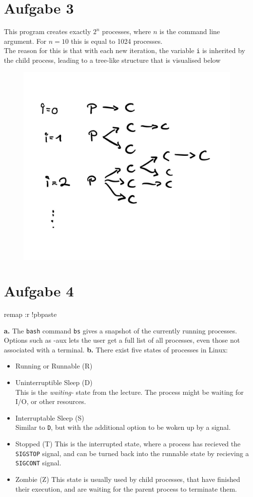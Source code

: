 \documentclass{article}
\begin{document}
\newpage

\section*{Aufgabe 3}
This program creates exactly \( 2 ^{n} \) processes, where \( n \) is the
command line argument. For \( n = 10 \) this is equal to 1024 processes.\\
The reason for this is that with each new iteration, the variable
\texttt{i} is inherited by the child process, leading to a tree-like
structure that is visualised below
\begin{figure}[H]
    \centering
    \includegraphics[width=.5\textwidth]{Fork.jpg}
\end{figure}
\section*{Aufgabe 4}
remap  :r !pbpaste


\textbf{a.} The \texttt{bash} command \texttt{bs} gives a snapshot of the currently
running processes. Options such as -aux lets the user get a full list of all
processes, even those not associated with a terminal.
\textbf{b.} There exist five states of processes in Linux:
\begin{itemize}
\item Running or Runnable (R)
\item Uninterruptible Sleep (D) \\ This is the \textit{waiting-} state 
    from the lecture. The process might be waiting for I/O, or other resources.
\item Interruptable Sleep (S) \\
    Similar to \texttt{D}, but with the additional option to be woken up by a
    signal.
\item Stopped (T)
    This is the interrupted state, where a process has recieved the
    \texttt{SIGSTOP} signal, and can be turned back into the runnable
    state by recieving a \texttt{SIGCONT} signal.
\item Zombie (Z)
    This state is usually used by child processes, that have finished their
    execution, and are waiting for the parent process to terminate them.
\end{itemize}
\end{document}
